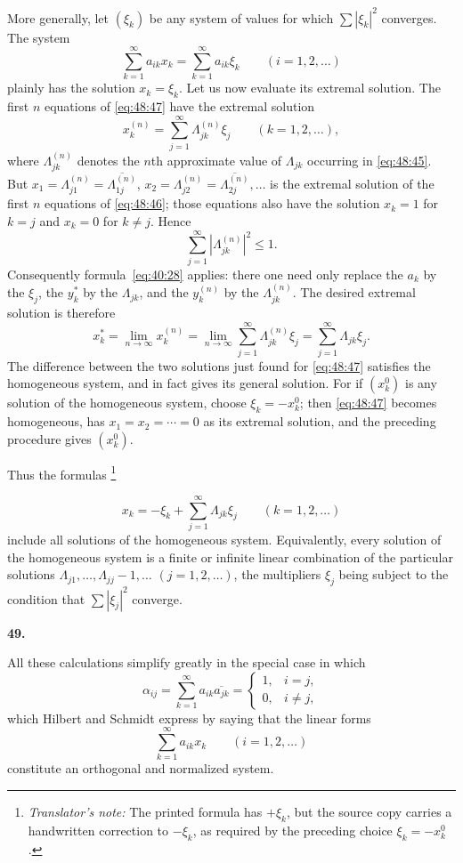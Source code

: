 \documentclass[
  paper=b5,
  fontsize=13pt,
  twoside=true,
  open=any,
  bookmarkpackage=false,
  chapterprefix=true,
  headings=normal
]{scrbook}
\theoremstyle{definition}
\newcommand{\numberedparagraph}[1]{%
  \par\medskip\phantomsection\label{sec:#1}%
  \noindent\textbf{#1.}\enspace
}
\newcounter{translatornote}
\newcommand{\translatornotelabel}{T\arabic{translatornote}}
\newcommand{\translatornote}[1]{%
  \stepcounter{translatornote}%
  \begingroup
    \edef\savedfootnotenumber{\number\value{footnote}}%
    \renewcommand{\thefootnote}{\translatornotelabel}%
    \footnote{\emph{Translator's note:} #1}%
    \setcounter{footnote}{\savedfootnotenumber}%
  \endgroup
}
\begin{document}
More generally, let $(\xi_k)$ be any system of values for which
$\sum|\xi_k|^2$ converges. The system
\begin{equation}
  \sum_{k=1}^{\infty}a_{ik}x_k
  =\sum_{k=1}^{\infty}a_{ik}\xi_k\qquad(i=1,2,\ldots)
  \tag{47}\label{eq:48:47}
\end{equation}
plainly has the solution $x_k=\xi_k$. Let us now evaluate its extremal
solution. The first $n$ equations of \eqref{eq:48:47} have the extremal
solution
\[
  x_k^{(n)}=\sum_{j=1}^{\infty}\Lambda_{jk}^{(n)}\xi_j
  \qquad(k=1,2,\ldots),
\]
where $\Lambda_{jk}^{(n)}$ denotes the $n$th approximate value of
$\Lambda_{jk}$ occurring
in \eqref{eq:48:45}. But
$x_1=\Lambda_{j1}^{(n)}=\overline{\Lambda_{1j}^{(n)}}$,
$x_2=\Lambda_{j2}^{(n)}=\overline{\Lambda_{2j}^{(n)}},\ldots$ is the
extremal solution of the first $n$ equations of \eqref{eq:48:46}; those
equations also have the solution $x_k=1$ for $k=j$ and $x_k=0$ for
$k\neq j$. Hence
\[
  \sum_{j=1}^{\infty}|\Lambda_{jk}^{(n)}|^2\leq1.
\]
Consequently formula~\eqref{eq:40:28} applies: there one need only replace the $a_k$
by the $\xi_j$, the $y_k^*$ by the $\Lambda_{jk}$, and the $y_k^{(n)}$ by
the $\Lambda_{jk}^{(n)}$. The desired extremal solution is therefore
\[
  x_k^*=\lim_{n\to\infty}x_k^{(n)}
  =\lim_{n\to\infty}\sum_{j=1}^{\infty}\Lambda_{jk}^{(n)}\xi_j
  =\sum_{j=1}^{\infty}\Lambda_{jk}\xi_j.
\]
The difference between the two solutions just found for
\eqref{eq:48:47} satisfies the homogeneous system, and in fact gives its
general solution. For if $(x_k^0)$ is any solution of the homogeneous
system, choose $\xi_k=-x_k^0$; then \eqref{eq:48:47} becomes homogeneous,
has $x_1=x_2=\cdots=0$ as its extremal solution, and the preceding procedure
gives $(x_k^0)$.

Thus the formulas\translatornote{The printed formula has \(+\xi_k\), but the
source copy carries a handwritten correction to \(-\xi_k\), as required by the
preceding choice \(\xi_k=-x_k^0\).}
\[
  x_k=-\xi_k+\sum_{j=1}^{\infty}\Lambda_{jk}\xi_j
  \qquad(k=1,2,\ldots)
\]
include all solutions of the homogeneous system. Equivalently, every
solution of the homogeneous system is a finite or infinite linear
combination of the particular solutions
$\Lambda_{j1},\ldots,\Lambda_{jj}-1,\ldots$ $(j=1,2,\ldots)$, the
multipliers $\xi_j$ being subject to the condition that
$\sum|\xi_j|^2$ converge.

\numberedparagraph{49}
All these calculations simplify greatly in the special case in which
\[
  \alpha_{ij}=\sum_{k=1}^{\infty}a_{ik}\overline{a_{jk}}
  =\begin{cases}1,&i=j,\\0,&i\neq j,\end{cases}
\]
which Hilbert and
Schmidt express by saying that the linear forms
\[
  \sum_{k=1}^{\infty}a_{ik}x_k\qquad(i=1,2,\ldots)
\]
constitute an orthogonal and normalized system.
\end{document}
